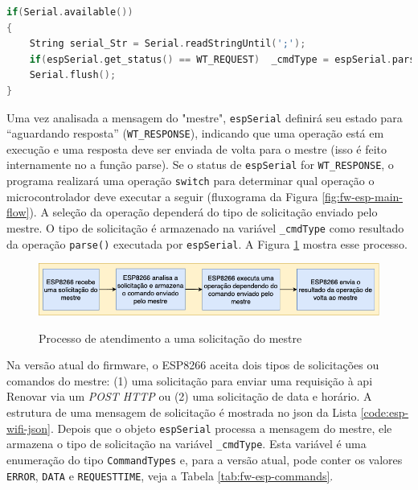 \begin{lstlisting}[language=C++, caption=Código para verificar as solicitações do mestre]
if(Serial.available())
{ 
    String serial_Str = Serial.readStringUntil(';');
    if(espSerial.get_status() == WT_REQUEST)  _cmdType = espSerial.parse(serial_Str);
    Serial.flush();
}
\end{lstlisting}
\label{code:esp-serial-check}

Uma vez analisada a mensagem do "mestre", \texttt{espSerial} definirá seu estado para “aguardando resposta” (\texttt{WT\_RESPONSE}), indicando que uma operação está em execução e uma resposta deve ser enviada de volta para o mestre (isso é feito internamente no a função parse). Se o status de \texttt{espSerial} for \texttt{WT\_RESPONSE}, o programa realizará uma operação \texttt{switch} para determinar qual operação o microcontrolador deve executar a seguir (fluxograma da Figura \ref{fig:fw-esp-main-flow}). A seleção da operação dependerá do tipo de solicitação enviado pelo mestre. O tipo de solicitação é armazenado na variável \texttt{\_cmdType} como resultado da operação \texttt{parse()} executada por \texttt{espSerial}. A Figura \ref{fig:fw-esp-comm-att} mostra esse processo.

\begin{figure}[h]
    \centering
    \caption{Processo de atendimento a uma solicitação do mestre}
    \includegraphics[width=0.9\linewidth]{aftertext//Firmware ESP8266/Figuras/ESP8266 sequence of comm operations (PT).png}
    \label{fig:fw-esp-comm-att}
\end{figure}

Na versão atual do firmware, o ESP8266 aceita dois tipos de solicitações ou comandos do mestre: (1) uma solicitação para enviar uma requisição à \acrshort*{api} Renovar via um \textit{POST HTTP} ou (2) uma solicitação de data e horário. A estrutura de uma mensagem de solicitação é mostrada no \acrshort{json} da Lista \ref{code:esp-wifi-json}. Depois que o objeto \texttt{espSerial} processa a mensagem do mestre, ele armazena o tipo de solicitação na variável \texttt{\_cmdType}. Esta variável é uma enumeração do tipo \texttt{CommandTypes} e, para a versão atual, pode conter os valores \texttt{ERROR}, \texttt{DATA} e \texttt{REQUESTTIME}, veja a Tabela \ref{tab:fw-esp-commands}.


